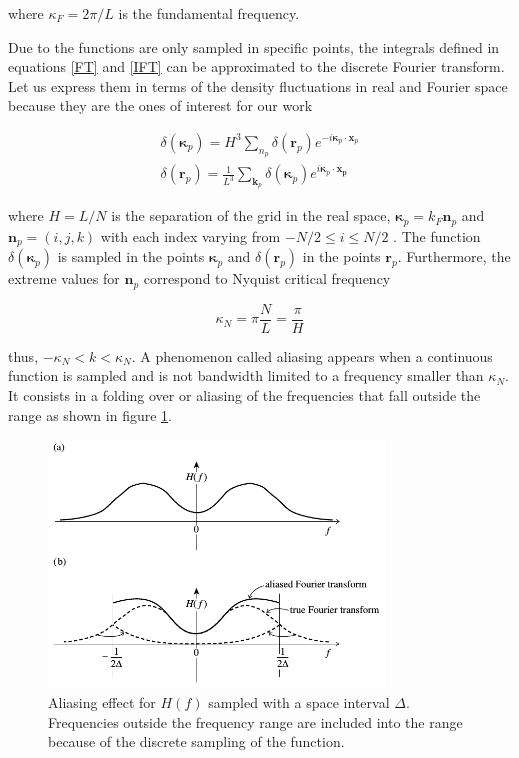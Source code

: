 where $\kappa_F=2\pi/L$ is the fundamental frequency.

Due to the functions are only sampled in specific points, the integrals defined in 
equations \ref{FT} and \ref{IFT} can be approximated to the discrete Fourier transform. 
Let us express them in terms of the density fluctuations in real and Fourier space 
because they are the ones of interest for our work 

\begin{eqnarray*}
\delta(\boldsymbol{\kappa}_p) = H^3 \sum_{n_p} \delta(\boldsymbol{r}_p) e^{-i\boldsymbol{\kappa}_p\cdot \boldsymbol{x}_p} \\
\delta(\boldsymbol{r}_p) = \frac{1}{L^3}\sum_{\boldsymbol{k}_p} \delta(\boldsymbol{\kappa}_p) e^{i\boldsymbol{\kappa}_p\cdot \boldsymbol{x_p}} 
\end{eqnarray*} 

where $H = L/N$ is the separation of the grid in the real space, 
$\boldsymbol{\kappa}_p = k_F \textbf{n}_p$ and $ \boldsymbol{n}_p = (i,j,k)$ with each index
varying from $-N/2 \leq i \leq N/2$ . The function $\delta(\boldsymbol{\kappa}_p)$ is sampled in the points $\boldsymbol{\kappa}_p$ and $\delta(\boldsymbol{r}_p)$ in the points $\boldsymbol{r}_p$.
Furthermore, the extreme values for $\boldsymbol{n}_p$ correspond to Nyquist critical 
frequency 

\[\kappa_N = \pi\frac{N}{L} = \frac{\pi}{H} \]

thus, $-\kappa_N < k < \kappa_N $. A phenomenon called aliasing appears when a continuous 
function is sampled and is not bandwidth limited to a frequency smaller than $\kappa_N$. 
It consists in a folding over or aliasing of the frequencies that fall outside the range
as shown in figure \ref{alias}. 

\begin{figure}[htbp]
       \centering
               \includegraphics[width=0.8\textwidth]{Images/chapter3/aliasing.png}
       \caption{\small Aliasing effect for $H(f)$ sampled with a space interval $\Delta$.
       Frequencies outside the frequency range are included into the range because
       of the discrete sampling of the function. }
       \label{alias}
 \end{figure}

